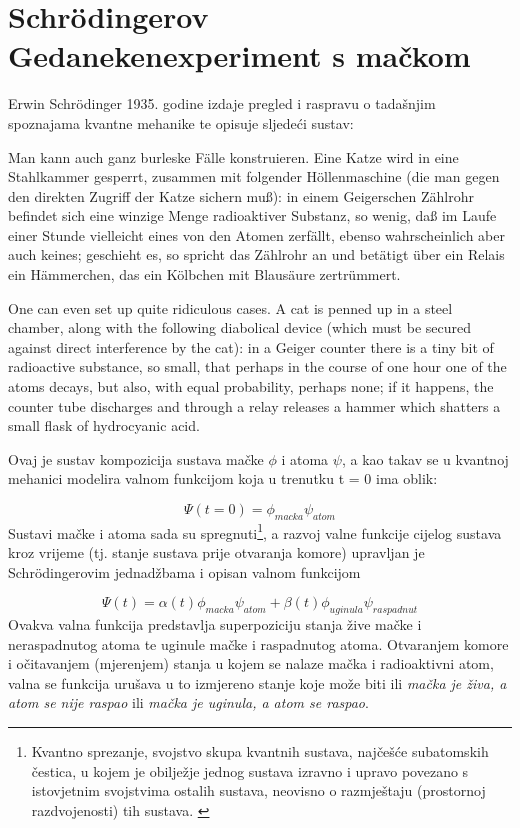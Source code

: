 \documentclass[twoside]{article}
\begin{document}
\section{Schrödingerov Gedanekenexperiment s mačkom}
Erwin Schrödinger 1935. godine izdaje pregled i raspravu o tadašnjim spoznajama kvantne mehanike te opisuje sljedeći sustav:

\begin{displayquote}
Man kann auch ganz burleske Fälle konstruieren. Eine Katze wird in eine Stahlkammer gesperrt, zusammen mit folgender Höllenmaschine (die man gegen den direkten Zugriff der Katze sichern muß): in einem Geigerschen Zählrohr befindet sich eine winzige Menge radioaktiver Substanz, so wenig, daß im Laufe einer Stunde vielleicht eines von den Atomen zerfällt, ebenso wahrscheinlich aber auch keines; geschieht es, so spricht das Zählrohr an und betätigt über ein Relais ein Hämmerchen, das ein Kölbchen mit Blausäure zertrümmert.\cite{Schroedinger1935} 
\end{displayquote}

\begin{displayquote}
One can even set up quite ridiculous cases. A cat is penned up in a steel chamber, along with the following diabolical device (which must be secured against direct interference by the cat): in a Geiger counter there is a tiny bit of radioactive substance, so small, that perhaps in the course of one hour one of the atoms decays, but also, with equal probability, perhaps none; if it happens, the counter tube discharges and through a relay releases a hammer which shatters a small flask of hydrocyanic acid.\cite{Trimmer1980}
\end{displayquote}

\noindent
Ovaj je sustav kompozicija sustava mačke $\phi$ i atoma $\psi$, a kao takav se u kvantnoj mehanici modelira valnom funkcijom koja u trenutku t = 0 ima oblik:

\[\Psi(t=0) = \phi_{macka}\psi_{atom}\]
\noindent
Sustavi mačke i atoma sada su spregnuti\footnote{Kvantno sprezanje, svojstvo skupa kvantnih sustava, najčešće subatomskih čestica, u kojem je obilježje jednog sustava izravno i upravo povezano s istovjetnim svojstvima ostalih sustava, neovisno o razmještaju (prostornoj razdvojenosti) tih sustava. \cite{MerriamWebster}}, a razvoj valne funkcije cijelog sustava kroz vrijeme (tj. stanje sustava prije otvaranja komore) upravljan je Schrödingerovim jednadžbama i opisan valnom funkcijom

\[\Psi(t) = \alpha(t)\phi_{macka}\psi_{atom} + \beta(t)\phi_{uginula}\psi_{raspadnut}\]
\noindent
Ovakva valna funkcija predstavlja superpoziciju stanja žive mačke i neraspadnutog atoma te uginule mačke i raspadnutog atoma. Otvaranjem komore i očitavanjem (mjerenjem) stanja u kojem se nalaze mačka i radioaktivni atom, valna se funkcija urušava u to izmjereno stanje koje može biti ili \emph{mačka je živa, a atom se nije raspao} ili \emph{mačka je uginula, a atom se raspao}.
\end{document}

